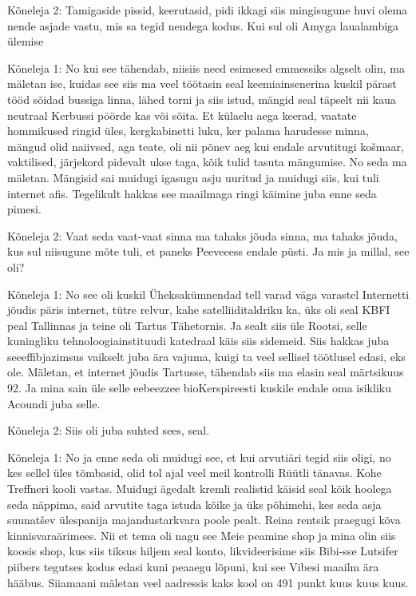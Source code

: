 Kõneleja 2:
Tamigaside pissid, keerutasid, pidi ikkagi siis mingisugune huvi olema nende asjade vastu, mis sa tegid nendega kodus. Kui sul oli Amyga laualambiga ülemise
                 
Kõneleja 1:
No kui see tähendab, niisiis need esimesed emmessiks algselt olin, ma mäletan ise, kuidas see siis ma veel töötasin seal keemiainsenerina kuskil pärast tööd sõidad bussiga linna, lähed torni ja siis istud, mängid seal täpselt nii kaua neutraal Kerbussi pöörde kas või sõita. Et külaelu aega keerad, vaatate hommikused ringid üles, kergkabinetti luku, ker palama harudesse minna, mängud olid naiivsed, aga teate, oli nii põnev aeg kui endale arvutitugi košmaar, vaktilised, järjekord pidevalt ukse taga, kõik tulid tasuta mängumise. No seda ma mäletan. Mängisid sai muidugi igasugu asju uuritud ja muidugi siis, kui tuli internet afis. Tegelikult hakkas see maailmaga ringi käimine juba enne seda pimesi.
                 
Kõneleja 2:
Vaat seda vaat-vaat sinna ma tahaks jõuda sinna, ma tahaks jõuda, kus sul niisugune mõte tuli, et paneks Peeveeess endale püsti. Ja mis ja millal, see oli?
                 
Kõneleja 1:
No see oli kuskil Üheksakümnendad tell varad väga varastel
Internetti jõudis päris internet, tütre relvur, kahe satelliiditaldriku ka, üks oli seal KBFI peal Tallinnas ja teine oli Tartus Tähetornis. Ja sealt siis üle Rootsi, selle kuningliku tehnoloogiainstituudi katedraal käis siis sidemeid. Siis hakkas juba seeeffibjazimsus vaikselt juba ära vajuma, kuigi ta veel sellisel töötlusel edasi, eks ole. Mäletan, et internet jõudis Tartusse, tähendab siis ma elasin seal märtsikuus 92. Ja mina sain üle selle eebeezzee bioKerspireesti kuskile endale oma isikliku Acoundi juba selle.
                 
Kõneleja 2:
Siis oli juba suhted sees, seal.
                 
Kõneleja 1:
No ja enne seda oli muidugi see, et kui arvutiäri tegid siis oligi, no kes sellel üles tõmbasid, olid tol ajal veel meil kontrolli Rüütli tänavas. Kohe Treffneri kooli vastas. Muidugi ägedalt kremli realistid käisid seal kõik hoolega seda näppima, said arvutite taga istuda kõike ja üks põhimehi, kes seda asja suunatšev ülespanija majandustarkvara poole pealt. Reina rentsik praegugi kõva kinnisvaraärimees. Nii et tema oli nagu see Meie peamine shop ja mina olin siis koosis shop, kus siis tiksus hiljem seal konto, likvideerisime siis Bibi-sse Lutsifer piibers tegutses kodus edasi kuni peaaegu lõpuni, kui see Vibesi maailm ära hääbus. Siiamaani mäletan veel aadressis kaks kool on 491 punkt kuus kuus kuus.
                 
